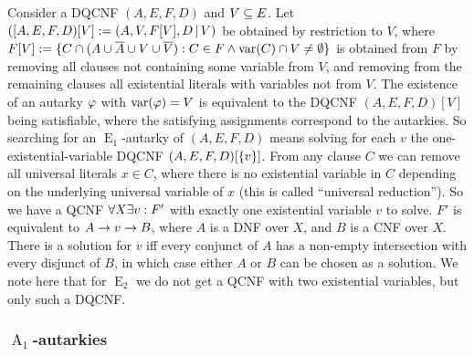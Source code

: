 \documentclass[conference]{IEEEtran}
\DeclareMathOperator{\Aaut}{A}
\DeclareMathOperator{\Eaut}{E}
\begin{document}
Consider a DQCNF $(A,E,F,D)$ and $V \subseteq E$.
Let $([A,E,F,D)[V] := (A, V, F[V], D \operatorname{|} V)$ be obtained by restriction to $V$, where $F[V] := \{ C \cap (A \cup \overline A \cup V \cup \overline V) : C \in F \wedge \operatorname{var}(C) \cap V \ne \emptyset \}$ is obtained from $F$ by removing all clauses not containing some variable from $V$, and removing from the remaining clauses all existential literals with variables not from $V$.
The existence of an autarky $\varphi$ with $\operatorname{var}(\varphi) = V$ is equivalent to the DQCNF $(A,E,F,D)[V]$ being satisfiable, where the satisfying assignments correspond to the autarkies.
So searching for an $\Eaut_1$-autarky of $(A,E,F,D)$ means solving for each $v$ the one-existential-variable DQCNF $(A,E,F,D)[\{ v \}]$.
From any clause $C$ we can remove all universal literals $x \in C$, where there is no existential variable in $C$ depending on the underlying universal variable of $x$ (this is called ``universal reduction'').
So we have a QCNF $\forall X \exists v : F'$ with exactly one existential variable $v$ to solve.
$F'$ is equivalent to $A \rightarrow v \rightarrow B$, where $A$ is a DNF over $X$, and $B$ is a CNF over $X$.
There is a solution for $v$ iff every conjunct of $A$ has a non-empty intersection with every disjunct of $B$, in which case either $A$ or $B$ can be chosen as a solution.
We note here that for $\Eaut_2$ we do not get a QCNF with two existential variables, but only such a DQCNF.

\subsubsection{$\Aaut_1$-autarkies}
\label{sec:a1aut}
\end{document}
